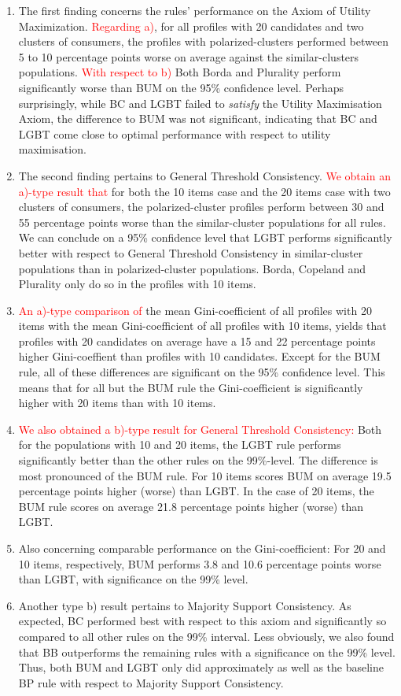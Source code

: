 \documentclass{article}
\begin{document}
\begin{enumerate}
\item The first finding concerns the rules' performance on the Axiom of Utility Maximization. \textcolor{red}{Regarding a)}, for all profiles with 20 candidates and two clusters of consumers, the profiles with polarized-clusters performed between 5 to 10 percentage points worse on average against the similar-clusters populations.
\textcolor{red}{With respect to b)} Both Borda and Plurality perform significantly worse than BUM on the 95\% confidence level. Perhaps surprisingly, while BC and LGBT failed to \emph{satisfy} the Utility Maximisation Axiom, the difference to BUM was not significant, indicating that BC and LGBT come close to optimal performance with respect to utility maximisation.
\item The second finding pertains to General Threshold Consistency. \textcolor{red}{We obtain an a)-type result that} for both the 10 items case and the 20 items case with two clusters of consumers, the polarized-cluster profiles perform between 30 and 55 percentage points worse than the similar-cluster populations for all rules.
We can conclude on a 95\% confidence level that LGBT performs significantly better with respect to General Threshold Consistency in similar-cluster populations than in polarized-cluster populations. Borda, Copeland and Plurality only do so in the profiles with 10 items.
\item \textcolor{red}{An a)-type comparison of} the mean Gini-coefficient of all profiles with 20 items with the mean Gini-coefficient of all profiles with 10 items, yields that profiles with 20 candidates on average have a 15 and 22 percentage points higher Gini-coeffient than profiles with 10 candidates.
Except for the BUM rule, all of these differences are significant on the 95\% confidence level.
This means that for all but the BUM rule the Gini-coefficient is significantly higher with 20 items than with 10 items.
\item
\textcolor{red}{We also obtained a b)-type result for General Threshold Consistency:} Both for the populations with 10 and 20 items, the LGBT rule performs significantly better than the other rules on the 99\%-level. The difference is most pronounced of the BUM rule. For 10 items scores BUM on average 19.5 percentage points higher (worse) than LGBT. In the case of 20 items, the BUM rule scores on average 21.8 percentage points higher (worse) than LGBT.
\item Also concerning comparable performance on the Gini-coefficient: For 20 and 10 items, respectively, BUM performs 3.8 and 10.6 percentage points worse than LGBT, with significance on the 99\% level.

\item Another type b) result pertains to Majority Support Consistency. As expected, BC performed best with respect to this axiom and significantly so compared to all other rules on the 99\% interval. Less obviously, we also found that BB outperforms the remaining rules with a significance on the 99\% level. Thus, both BUM and LGBT only did approximately as well as the baseline BP rule with respect to Majority Support Consistency.
\end{enumerate}
\end{document}
